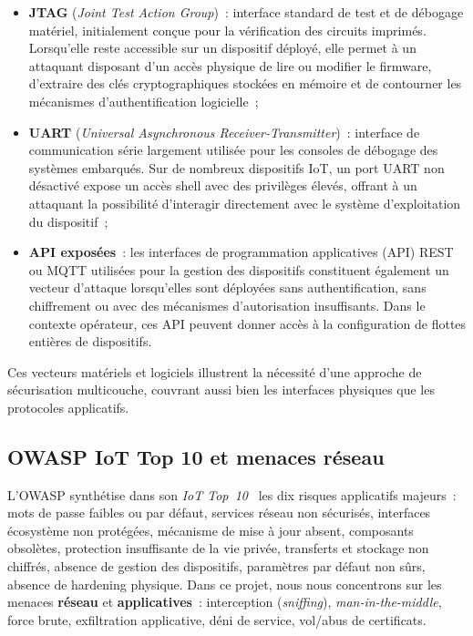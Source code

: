 \begin{itemize}[leftmargin=*]
  \item \textbf{JTAG} (\emph{Joint Test Action Group})~: interface standard de test et de débogage matériel, initialement conçue pour la vérification des circuits imprimés. Lorsqu'elle reste accessible sur un dispositif déployé, elle permet à un attaquant disposant d'un accès physique de lire ou modifier le firmware, d'extraire des clés cryptographiques stockées en mémoire et de contourner les mécanismes d'authentification logicielle~;
  \item \textbf{UART} (\emph{Universal Asynchronous Receiver-Transmitter})~: interface de communication série largement utilisée pour les consoles de débogage des systèmes embarqués. Sur de nombreux dispositifs IoT, un port UART non désactivé expose un accès shell avec des privilèges élevés, offrant à un attaquant la possibilité d'interagir directement avec le système d'exploitation du dispositif~;
  \item \textbf{API exposées}~: les interfaces de programmation applicatives (\acs{API}) REST ou MQTT utilisées pour la gestion des dispositifs constituent également un vecteur d'attaque lorsqu'elles sont déployées sans authentification, sans chiffrement ou avec des mécanismes d'autorisation insuffisants. Dans le contexte opérateur, ces API peuvent donner accès à la configuration de flottes entières de dispositifs.
\end{itemize}

Ces vecteurs matériels et logiciels illustrent la nécessité d'une approche de sécurisation multicouche, couvrant aussi bien les interfaces physiques que les protocoles applicatifs.

\subsection{OWASP IoT Top 10 et menaces réseau}

L'OWASP synthétise dans son \emph{IoT Top~10}~\cite{owasp_iot} les dix risques applicatifs majeurs~: mots de passe faibles ou par défaut, services réseau non sécurisés, interfaces écosystème non protégées, mécanisme de mise à jour absent, composants obsolètes, protection insuffisante de la vie privée, transferts et stockage non chiffrés, absence de gestion des dispositifs, paramètres par défaut non sûrs, absence de hardening physique. Dans ce projet, nous nous concentrons sur les menaces \textbf{réseau} et \textbf{applicatives}~: interception (\emph{sniffing}), \emph{man-in-the-middle}, force brute, exfiltration applicative, déni de service, vol/abus de certificats.

